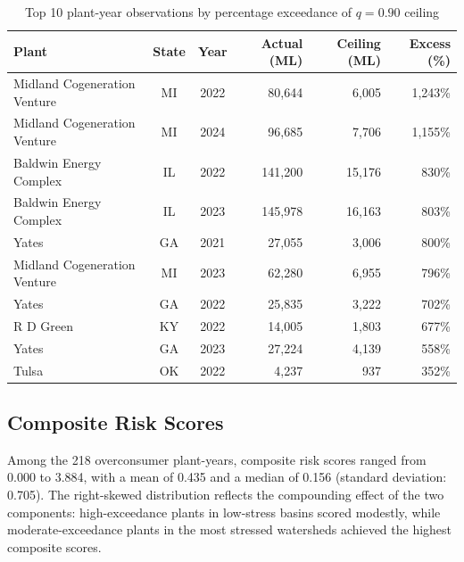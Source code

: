\documentclass[11pt, letterpaper]{article}
\begin{document}
\begin{table}[ht]
  \centering
  \caption{Top 10 plant-year observations by percentage exceedance of $q = 0.90$ ceiling}
  \label{tab:top10}
  \small
  \begin{tabularx}{\linewidth}{Xccrrr}
    \toprule
    \rowcolor{headerbg}
    \color{white}\textbf{Plant} &
    \color{white}\textbf{State} &
    \color{white}\textbf{Year} &
    \color{white}\textbf{Actual (ML)} &
    \color{white}\textbf{Ceiling (ML)} &
    \color{white}\textbf{Excess (\%)} \\
    \midrule
    Midland Cogeneration Venture & MI & 2022 & 80{,}644   & 6{,}005  & 1{,}243\% \\
    Midland Cogeneration Venture & MI & 2024 & 96{,}685   & 7{,}706  & 1{,}155\% \\
    Baldwin Energy Complex        & IL & 2022 & 141{,}200  & 15{,}176 & 830\%     \\
    Baldwin Energy Complex        & IL & 2023 & 145{,}978  & 16{,}163 & 803\%     \\
    Yates                         & GA & 2021 & 27{,}055   & 3{,}006  & 800\%     \\
    Midland Cogeneration Venture & MI & 2023 & 62{,}280   & 6{,}955  & 796\%     \\
    Yates                         & GA & 2022 & 25{,}835   & 3{,}222  & 702\%     \\
    R D Green                     & KY & 2022 & 14{,}005   & 1{,}803  & 677\%     \\
    Yates                         & GA & 2023 & 27{,}224   & 4{,}139  & 558\%     \\
    Tulsa                         & OK & 2022 & 4{,}237    &   937    & 352\%     \\
    \bottomrule
  \end{tabularx}
\end{table}

\subsection{Composite Risk Scores}

Among the 218 overconsumer plant-years, composite risk scores ranged from 0.000 to 3.884, with a mean of 0.435 and a median of 0.156 (standard deviation: 0.705). The right-skewed distribution reflects the compounding effect of the two components: high-exceedance plants in low-stress basins scored modestly, while moderate-exceedance plants in the most stressed watersheds achieved the highest composite scores.
\end{document}
